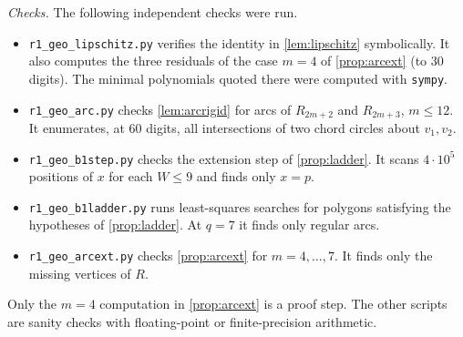 \emph{Checks.} The following independent checks were run.
\begin{itemize}[leftmargin=2em]
\item \texttt{r1\_geo\_lipschitz.py} verifies the identity in \cref{lem:lipschitz} symbolically. It also computes the three residuals of the case $m=4$ of \cref{prop:arcext} (to $30$ digits). The minimal polynomials quoted there were computed with \texttt{sympy}.
\item \texttt{r1\_geo\_arc.py} checks \cref{lem:arcrigid} for arcs of $R_{2m+2}$ and $R_{2m+3}$, $m\le12$. It enumerates, at $60$ digits, all intersections of two chord circles about $v_1,v_2$.
\item \texttt{r1\_geo\_b1step.py} checks the extension step of \cref{prop:ladder}. It scans $4\cdot10^5$ positions of $x$ for each $W\le9$ and finds only $x=p$.
\item \texttt{r1\_geo\_b1ladder.py} runs least-squares searches for polygons satisfying the hypotheses of \cref{prop:ladder}. At $q=7$ it finds only regular arcs.
\item \texttt{r1\_geo\_arcext.py} checks \cref{prop:arcext} for $m=4,\dots,7$. It finds only the missing vertices of $R$.
\end{itemize}
Only the $m=4$ computation in \cref{prop:arcext} is a proof step. The other scripts are sanity checks with floating-point or finite-precision arithmetic.
